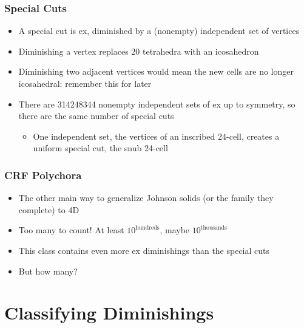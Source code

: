\documentclass{beamer}
\begin{document}
\begin{frame}
  \frametitle{Special Cuts}
  \begin{itemize}
  \item
    A special cut is ex, diminished by a (nonempty) independent set of vertices
  \item
    Diminishing a vertex replaces 20 tetrahedra with an icosahedron
  \item
    Diminishing two adjacent vertices would mean the new cells are no longer icosahedral: remember this for later
  \item
    There are 314248344 nonempty independent sets of ex up to symmetry,
    so there are the same number of special cuts
    \begin{itemize}
    \item
      One independent set, the vertices of an inscribed 24-cell,
      creates a uniform special cut, the snub 24-cell
    \end{itemize}
  \end{itemize}
\end{frame}

\begin{frame}
  \frametitle{CRF Polychora}
  \begin{itemize}
  \item
    The other main way to generalize Johnson solids (or the family they complete)
    to 4D
  \item
    Too many to count! At least $10^\text{hundreds}$, maybe $10^\text{thousands}$
  \item
    This class contains even more ex diminishings than the special cuts
  \item
    But how many?
  \end{itemize}
\end{frame}

\section{Classifying Diminishings}
\end{document}
